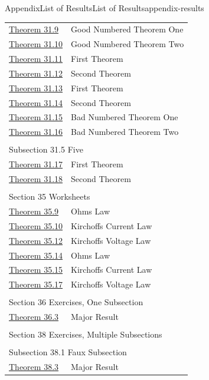 \documentclass[twoside,10pt,]{article}
\numberwithin{equation}{section}
\begin{document}
\begin{appendixptx}{Appendix}{List of Results}{}{List of Results}{}{}{appendix-results}
\begin{longtable}[l]{ll}
\hyperref[theorem-good-one]{Theorem 31.9}& Good Numbered Theorem One\\
\hyperref[theorem-good-two]{Theorem 31.10}& Good Numbered Theorem Two\\
\hyperref[theorem-number-09]{Theorem 31.11}& First Theorem\\
\hyperref[theorem-number-10]{Theorem 31.12}& Second Theorem\\
\hyperref[theorem-number-11]{Theorem 31.13}& First Theorem\\
\hyperref[theorem-number-12]{Theorem 31.14}& Second Theorem\\
\hyperref[theorem-bad-one]{Theorem 31.15}& Bad Numbered Theorem One\\
\hyperref[theorem-bad-two]{Theorem 31.16}& Bad Numbered Theorem Two\\
\multicolumn{2}{l}{\null}\\[1.5ex] \multicolumn{2}{l}{\large Subsection 31.5 Five}\\[0.5ex]
\hyperref[theorem-number-13]{Theorem 31.17}& First Theorem\\
\hyperref[theorem-number-14]{Theorem 31.18}& Second Theorem\\
\multicolumn{2}{l}{\null}\\[1.5ex] \multicolumn{2}{l}{\large Section 35 Worksheets}\\[0.5ex]
\hyperref[worksheet-networks-2-3]{Theorem 35.9}& Ohms Law\\
\hyperref[worksheet-networks-2-4]{Theorem 35.10}& Kirchoffs Current Law\\
\hyperref[worksheet-networks-2-6]{Theorem 35.12}& Kirchoffs Voltage Law\\
\hyperref[worksheet-networks-pages-2-3]{Theorem 35.14}& Ohms Law\\
\hyperref[worksheet-networks-pages-2-4]{Theorem 35.15}& Kirchoffs Current Law\\
\hyperref[worksheet-networks-pages-2-6]{Theorem 35.17}& Kirchoffs Voltage Law\\
\multicolumn{2}{l}{\null}\\[1.5ex] \multicolumn{2}{l}{\large Section 36 Exercises, One Subsection}\\[0.5ex]
\hyperref[section-exercises-single-8]{Theorem 36.3}& Major Result\\
\multicolumn{2}{l}{\null}\\[1.5ex] \multicolumn{2}{l}{\large Section 38 Exercises, Multiple Subsections}\\[0.5ex]
\multicolumn{2}{l}{\null}\\[1.5ex] \multicolumn{2}{l}{\large Subsection 38.1 Faux Subsection}\\[0.5ex]
\hyperref[section-exercises-multiple-3-5]{Theorem 38.3}& Major Result\\
\end{longtable}
\end{appendixptx}
\end{document}
